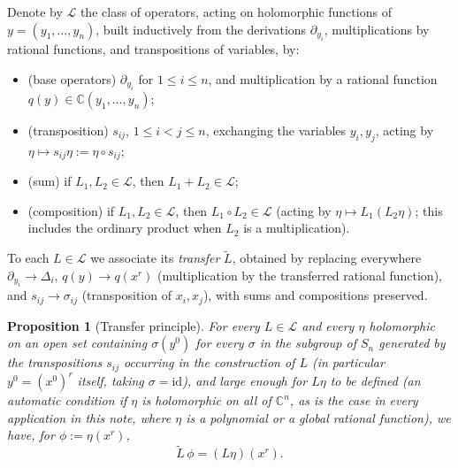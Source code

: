 \documentclass[10pt,a4paper]{amsart}
\newtheorem{proposition}[theorem]{Proposition}
\newcommand{\CC}{\mathbb{C}}
\begin{document}
Denote by $\mathcal L$ the class of operators, acting on holomorphic functions of $y=(y_1,\dots,y_n)$, built inductively from the derivations $\partial_{y_i}$, multiplications by rational functions, and transpositions of variables, by:
\begin{itemize}
\item[(i)] (base operators) $\partial_{y_i}$ for $1\le i\le n$, and multiplication by a rational function $q(y)\in\CC(y_1,\dots,y_n)$;
\item[(ii)] (transposition) $s_{ij}$, $1\le i<j\le n$, exchanging the variables $y_i,y_j$, acting by $\eta\mapsto s_{ij}\eta:=\eta\circ s_{ij}$;
\item[(iii)] (sum) if $L_1,L_2\in\mathcal L$, then $L_1+L_2\in\mathcal L$;
\item[(iv)] (composition) if $L_1,L_2\in\mathcal L$, then $L_1\circ L_2\in\mathcal L$ (acting by $\eta\mapsto L_1(L_2\eta)$; this includes the ordinary product when $L_2$ is a multiplication).
\end{itemize}
To each $L\in\mathcal L$ we associate its \emph{transfer} $\widetilde L$, obtained by replacing everywhere $\partial_{y_i}\to\Delta_i$, $q(y)\to q(x^r)$ (multiplication by the transferred rational function), and $s_{ij}\to\sigma_{ij}$ (transposition of $x_i,x_j$), with sums and compositions preserved.

\begin{proposition}[Transfer principle]\label{prop:transfert}
For every $L\in\mathcal L$ and every $\eta$ holomorphic on an open set containing $\sigma(y^0)$ for every $\sigma$ in the subgroup of $S_n$ generated by the transpositions $s_{ij}$ occurring in the construction of $L$ (in particular $y^0=(x^0)^r$ itself, taking $\sigma=\mathrm{id}$), and large enough for $L\eta$ to be defined (an automatic condition if $\eta$ is holomorphic on all of $\CC^n$, as is the case in every application in this note, where $\eta$ is a polynomial or a global rational function), we have, for $\phi:=\eta(x^r)$,
\[
\widetilde L\,\phi = (L\eta)(x^r).
\]
\end{proposition}
\end{document}
